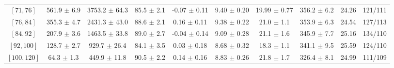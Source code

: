\begin{tabular}{c||c|c|c|c|c|c|c||c|c}
$[71, 76]$ & 561.9 $\pm$ 6.9 & 3753.2 $\pm$ 64.3 & 85.5 $\pm$ 2.1 & -0.07 $\pm$ 0.11 & 9.40 $\pm$ 0.20 & 19.99 $\pm$ 0.77 & 356.2 $\pm$ 6.2 & 24.26 & 121/111\\
$[76, 84]$ & 355.3 $\pm$ 4.7 & 2431.3 $\pm$ 43.0 & 88.6 $\pm$ 2.1 & 0.16 $\pm$ 0.11 & 9.38 $\pm$ 0.22 & 21.0 $\pm$ 1.1 & 353.9 $\pm$ 6.3 & 24.54 & 127/113\\
$[84, 92]$ & 207.9 $\pm$ 3.6 & 1463.5 $\pm$ 33.8 & 89.0 $\pm$ 2.7 & -0.04 $\pm$ 0.14 & 9.09 $\pm$ 0.28 & 21.1 $\pm$ 1.6 & 345.9 $\pm$ 7.7 & 25.16 & 134/110\\
$[92, 100]$ & 128.7 $\pm$ 2.7 & 929.7 $\pm$ 26.4 & 84.1 $\pm$ 3.5 & 0.03 $\pm$ 0.18 & 8.68 $\pm$ 0.32 & 18.3 $\pm$ 1.1 & 341.1 $\pm$ 9.5 & 25.59 & 124/110\\
$[100, 120]$ & 64.3 $\pm$ 1.3 & 449.9 $\pm$ 11.8 & 90.5 $\pm$ 2.2 & 0.14 $\pm$ 0.16 & 8.83 $\pm$ 0.26 & 21.8 $\pm$ 1.7 & 326.4 $\pm$ 8.1 & 24.99 & 111/109\\
\end{tabular}
